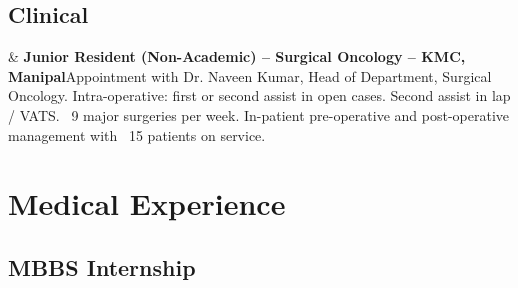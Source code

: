 \documentclass[10pt, letterpaper]{article}
\newcommand{\Year}[1]{\fontsize{9pt}{0}\selectfont #1}
\newcommand{\Twoline}[2]{\textbf{#1}\newline  #2}
\begin{document}
\subsection{Clinical}
\begin{EntriesTable}
  \Year{2021} &
  \Twoline{Junior Resident (Non-Academic) – Surgical Oncology – KMC, Manipal}
  {Appointment with Dr. Naveen Kumar, Head of Department, Surgical Oncology.\newline
  Intra-operative: first or second assist in open cases. Second assist in lap / VATS. ~9 major surgeries per week.\newline
  In-patient pre-operative and post-operative management with ~15 patients on service.\newline
  }
\end{EntriesTable}


\section{Medical Experience}
\subsection{MBBS Internship}
\end{document}
